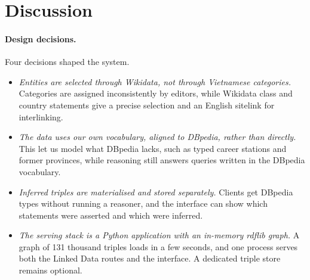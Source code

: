 \section{Discussion}
\label{sec:discussion}

\paragraph{Design decisions.} Four decisions shaped the system.
\begin{itemize}
  \item \emph{Entities are selected through Wikidata, not through Vietnamese
        categories.} Categories are assigned inconsistently by editors, while
        Wikidata class and country statements give a precise selection and an
        English sitelink for interlinking.
  \item \emph{The data uses our own vocabulary, aligned to DBpedia, rather
        than  directly.} This let us model what DBpedia lacks,
        such as typed career stations and former provinces, while reasoning
        still answers queries written in the DBpedia vocabulary.
  \item \emph{Inferred triples are materialised and stored separately.}
        Clients get DBpedia types without running a reasoner, and the
        interface can show which statements were asserted and which were
        inferred.
  \item \emph{The serving stack is a Python application with an in-memory
        rdflib graph.} A graph of 131 thousand triples loads in a few
        seconds, and one process serves both the Linked Data routes and the
        interface. A dedicated triple store remains optional.
\end{itemize}

